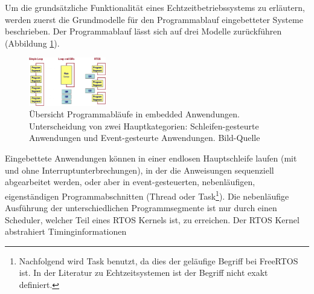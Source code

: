 Um die grund\-sätz\-liche Funktionalität eines Echtzeitbetriebssystems zu erläutern, werden zuerst die Grundmodelle für den Programmablauf eingebetteter Systeme beschrieben. Der Programmablauf lässt sich auf drei Modelle zu\-rück\-füh\-ren\cite{RTOSRevealed} (Abbildung \ref{fig:Programmablauf}). 
\begin{figure}[ht]
	\centering
		\includegraphics[width=0.3\textwidth]{Pictures/EmbeddedCom/cwrtos2f5c.jpg}
	\caption{Übersicht Programmabläufe in embedded Anwendungen. Unterscheidung von zwei Hauptkategorien: Schleifen-gesteurte Anwendungen und Event-gesteurte Anwendungen. Bild-Quelle~\protect{}}
	\label{fig:Programmablauf}
\end{figure}
Eingebettete Anwendungen können in einer endlosen Hauptschleife laufen (mit und ohne Interruptunterbrechungen), in der die Anweisungen sequenziell abgearbeitet werden, oder aber in event-gesteuerten, ne\-ben\-läuf\-igen, ei\-gen\-stän\-dig\-en Pro\-gramm\-ab\-schnit\-ten (Thre\-ad oder Task\footnote{Nachfolgend wird Task benutzt, da dies der geläufige Begriff bei FreeRTOS ist. In der Literatur zu Echtzeitsystemen ist der Begriff nicht exakt definiert.}). Die ne\-ben\-läuf\-ige Aus\-füh\-rung der unterschiedlichen Programmsegmente ist nur durch einen Scheduler, welcher Teil eines RTOS Kernels ist, zu erreichen. Der RTOS Kernel abstrahiert Timinginformationen\cite{MasteringFreeRtos} 
